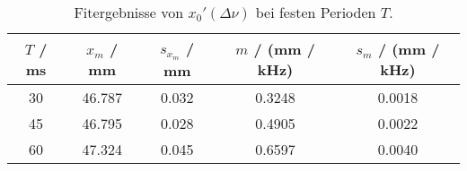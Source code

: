 \begin{table}[H]
\caption{Fitergebnisse von $x_0'(\Delta \nu)$ bei festen Perioden $T$.}
\begin{center}
\begin{tabular}{|c|c|c|c|c|}
  \hline
  $T$ / ms & $x_m$ / mm & $s_{x_m}$ / mm & $m$ / (mm / kHz) & $s_m$ / (mm / kHz) \\ \hline
  30 & 46.787 & 0.032 & 0.3248 & 0.0018 \\ \hline
  45 & 46.795 & 0.028 & 0.4905 & 0.0022 \\ \hline
  60 & 47.324 & 0.045 & 0.6597 & 0.0040 \\ \hline
\end{tabular}
\end{center}
\label{tab:fit:x0}
\end{table}
